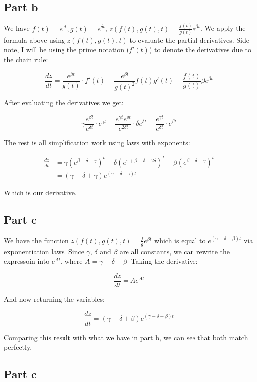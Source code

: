 \documentclass{article}
\theoremstyle{definition}
\numberwithin{equation}{section}
\numberwithin{definition}{section}
\begin{document}
\subsection{Part b}

We have $f(t) = e^{\gamma t}, g(t) = e^{\delta t}$, $z(f(t), g(t), t) = \frac{f(t)}{g(t)} e^{\beta t}$. We apply the formula above using $z(f(t), g(t), t)$ to evaluate the partial derivatives. Side note, I will be using the prime notation ($f'(t)$) to denote the derivatives due to the chain rule:

\[ \frac{dz}{dt} = \frac{e^{\beta t}}{g(t)} \cdot f'(t) - \frac{e^{\beta t}}{g(t)^2} f(t)  g'(t) + \frac{f(t)}{g(t)} \beta e^{\beta t}\]

After evaluating the derivatives we get:

\[ \gamma \frac{e^{\beta t}}{e^{\delta t}} \cdot e^{\gamma t} - \frac{e^{\gamma t} e^{\beta t}}{e^{2\delta t}} \cdot \delta e^{\delta t} + \frac{e^{\gamma t}}{e^{\delta t}} \cdot e^{\beta t}\]

The rest is all simplification work using laws with exponents:

\begin{align*}
	\frac{dz}{dt} &= \gamma \left(e^{\beta - \delta + \gamma} \right)^t - \delta \left(e^{\gamma + \beta  + \delta - 2\delta}\right)^t + \beta \left(e^{\beta - \delta + \gamma}\right)^t  \\
	&= \boxed{(\gamma - \delta + \gamma)e^{(\gamma - \delta + \gamma)t}}
\end{align*}

Which is our derivative. 

\subsection{Part c} 
We have the function $z(f(t), g(t), t) = \frac{f}{g} e^{\beta t}$ which is equal to $e^{(\gamma - \delta + \beta)t}$ via exponentiation laws. Since $\gamma$, $\delta$ and $\beta$ are all constants, we can rewrite the expressoin into $e^{At}$, where $A = \gamma - \delta + \beta$. Taking the derivative:

\[ \frac{dz}{dt} = A e^{At}\]

And now returning the variables: 

\[ \frac{dz}{dt} = (\gamma - \delta + \beta) e^{(\gamma - \delta + \beta)t}\]

Comparing this result with what we have in part b, we can see that both match perfectly.


\subsection{Part c} 
\end{document}
